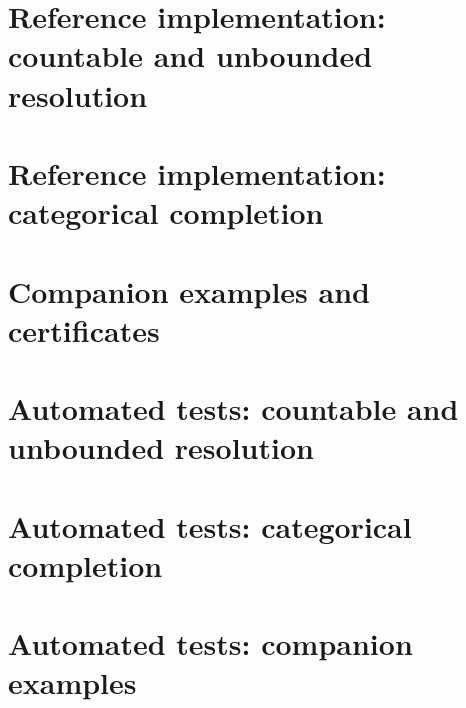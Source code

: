 \documentclass[11pt]{article}
\theoremstyle{definition}
\theoremstyle{remark}
\begin{document}
\section{Reference implementation: countable and unbounded resolution}

\clearpage
\section{Reference implementation: categorical completion}

\clearpage
\section{Companion examples and certificates}

\clearpage
\section{Automated tests: countable and unbounded resolution}

\clearpage
\section{Automated tests: categorical completion}

\clearpage
\section{Automated tests: companion examples}

\clearpage
\end{document}
